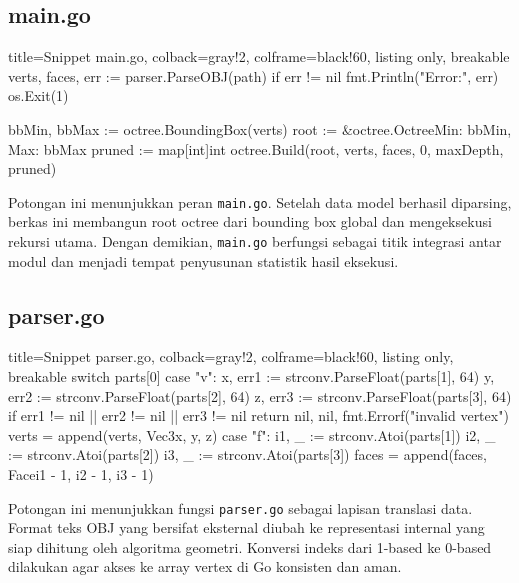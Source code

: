 \subsection{main.go}
\begin{tcblisting}{
        title={Snippet main.go},
        colback=gray!2,
        colframe=black!60,
        listing only,
        breakable
    }
    verts, faces, err := parser.ParseOBJ(path)
    if err != nil {
            fmt.Println("Error:", err)
            os.Exit(1)
        }

    bbMin, bbMax := octree.BoundingBox(verts)
    root := &octree.Octree{Min: bbMin, Max: bbMax}
    pruned := map[int]int{}
    octree.Build(root, verts, faces, 0, maxDepth, pruned)
\end{tcblisting}

Potongan ini menunjukkan peran \texttt{main.go}. Setelah data model berhasil diparsing, berkas ini membangun root octree dari bounding box global dan mengeksekusi rekursi utama. Dengan demikian, \texttt{main.go} berfungsi sebagai titik integrasi antar modul dan menjadi tempat penyusunan statistik hasil eksekusi.

\subsection{parser.go}
\begin{tcblisting}{
        title={Snippet parser.go},
        colback=gray!2,
        colframe=black!60,
        listing only,
        breakable
    }
    switch parts[0] {
            case "v":
            x, err1 := strconv.ParseFloat(parts[1], 64)
            y, err2 := strconv.ParseFloat(parts[2], 64)
            z, err3 := strconv.ParseFloat(parts[3], 64)
            if err1 != nil || err2 != nil || err3 != nil {
                    return nil, nil, fmt.Errorf("invalid vertex")
                }
            verts = append(verts, Vec3{x, y, z})
            case "f":
            i1, _ := strconv.Atoi(parts[1])
            i2, _ := strconv.Atoi(parts[2])
            i3, _ := strconv.Atoi(parts[3])
            faces = append(faces, Face{i1 - 1, i2 - 1, i3 - 1})
        }
\end{tcblisting}

Potongan ini menunjukkan fungsi \texttt{parser.go} sebagai lapisan translasi data. Format teks OBJ yang bersifat eksternal diubah ke representasi internal yang siap dihitung oleh algoritma geometri. Konversi indeks dari 1-based ke 0-based dilakukan agar akses ke array vertex di Go konsisten dan aman.

